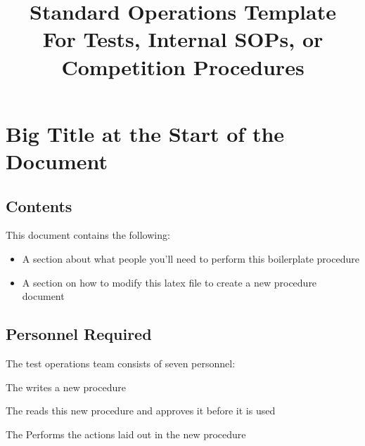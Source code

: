 

\title{
\Huge Standard Operations Template\\
\vspace{1cm}
\Large For Tests, Internal SOPs, or Competition Procedures}








\section{Big Title at the Start of the Document}


\subsection{Contents}
This document contains the following:
\begin{itemize}
    \item A section about what people you'll need to perform this boilerplate procedure
    \item A section on how to modify this latex file to create a new procedure document
\end{itemize}

\subsection{Personnel Required}
The test operations team consists of seven personnel:
\begin{checklist}
    \item The \authfull{} writes a new procedure
    \item The \edifull{} reads this new procedure and approves it before it is used
    \item The \perffull{} Performs the actions laid out in the new procedure
\end{checklist}
\setcounter{checklistnum}{0}

